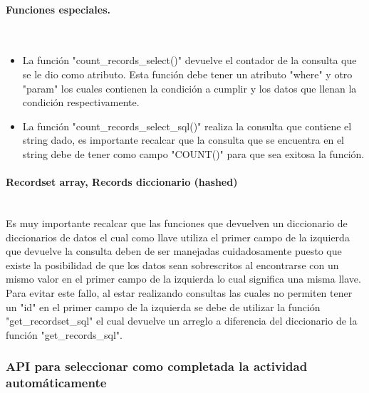 \begin{itemize}
    \end{itemize}

    \paragraph{Funciones especiales.}\mbox{}\\

\begin{itemize}
  \item La función "count\_records\_select()" devuelve el contador de la consulta que se le dio como atributo. Esta función debe tener un atributo "where" y otro "param" los cuales contienen la condición a cumplir y los datos que llenan la condición respectivamente.
  \item La función "count\_records\_select\_sql()" realiza la consulta que contiene el string dado, es importante recalcar que la consulta que se encuentra en el string debe de tener como campo "COUNT()" para que sea exitosa la función.
\end{itemize}

    \paragraph{Recordset array, Records diccionario (hashed)}\mbox{}\\

			Es muy importante recalcar que las funciones que devuelven un diccionario de diccionarios de datos el cual como llave utiliza el primer campo de la izquierda que devuelve la consulta deben de ser manejadas cuidadosamente puesto que existe la posibilidad de que los datos sean sobrescritos al encontrarse con un mismo valor en el primer campo de la izquierda lo cual significa una misma llave.\\
			Para evitar este fallo, al estar realizando consultas las cuales no permiten tener un "id" en el primer campo de la izquierda se debe de utilizar la función "get\_recordset\_sql" el cual devuelve un arreglo a diferencia del diccionario de la función "get\_records\_sql".


  \subsubsection{API para seleccionar como completada la actividad automáticamente}

